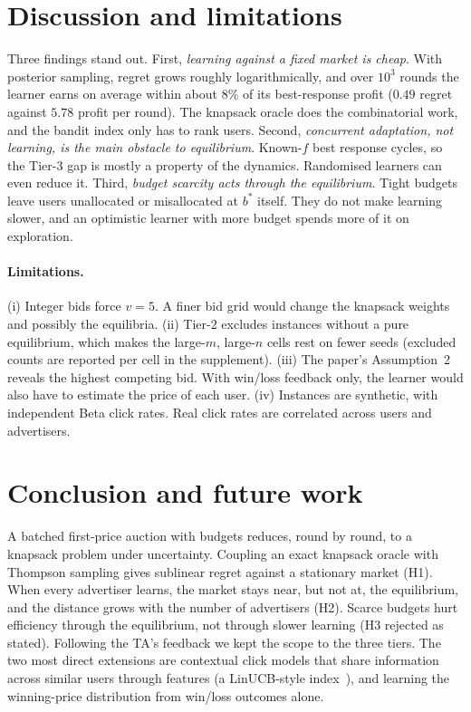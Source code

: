 \documentclass[11pt]{article}
\theoremstyle{remark}
\begin{document}
\section{Discussion and limitations}
Three findings stand out. First, \emph{learning against a fixed market is cheap}. With posterior
sampling, regret grows roughly logarithmically, and over $10^3$ rounds the learner earns on average
within about $8\%$ of its best-response profit ($0.49$ regret against $5.78$ profit per round). The knapsack oracle does the combinatorial work, and the bandit index only has to
rank users. Second, \emph{concurrent adaptation, not learning, is the main obstacle to equilibrium}.
Known-$f$ best response cycles, so the Tier-3 gap is mostly a property of the dynamics. Randomised
learners can even reduce it. Third, \emph{budget scarcity acts through the equilibrium}. Tight
budgets leave users unallocated or misallocated at $b^*$ itself. They do not make learning slower, and
an optimistic learner with more budget spends more of it on exploration.

\paragraph{Limitations.} (i) Integer bids force $v=5$. A finer bid grid would change the knapsack
weights and possibly the equilibria. (ii) Tier-2 excludes instances without a pure equilibrium, which
makes the large-$m$, large-$n$ cells rest on fewer seeds (excluded counts are reported per cell in the
supplement). (iii) The paper's Assumption~2 reveals the highest competing bid. With win/loss feedback
only, the learner would also have to estimate the price of each user. (iv) Instances are synthetic,
with independent Beta click rates. Real click rates are correlated across users and advertisers.

\section{Conclusion and future work}
A batched first-price auction with budgets reduces, round by round, to a knapsack problem under
uncertainty. Coupling an exact knapsack oracle with Thompson sampling gives sublinear regret against a
stationary market (H1). When every advertiser learns, the market stays near, but not at, the
equilibrium, and the distance grows with the number of advertisers (H2). Scarce budgets hurt efficiency
through the equilibrium, not through slower learning (H3 rejected as stated). Following the TA's
feedback we kept the scope to the three tiers. The two most direct extensions are contextual click
models that share information across similar users through features (a LinUCB-style
index~\citep{li2010contextual}), and learning the winning-price distribution from win/loss
outcomes alone.
\end{document}
